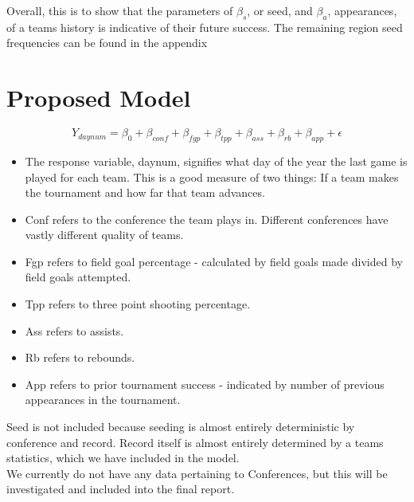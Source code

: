 \documentclass[]{scrartcl}
\begin{document}
Overall, this is to show that the parameters of $\beta_s$, or seed, and $\beta_a$, appearances, of a teams history is indicative of their future success. The remaining region seed frequencies can be found in the appendix
\section*{Proposed Model}
	\[
	Y_{daynum} = \beta_0 + \beta_{conf} + \beta_{fgp} +\beta_{tpp} + \beta_{ass} + \beta_{rb} + \beta_{app} + \epsilon
	\]
	\begin{itemize}
	\item The response variable, daynum, signifies what day of the year the last game is played for each team. This is a good measure of two things: If a team makes the tournament and how far that team advances.
		\item Conf refers to the conference the team plays in. Different conferences have vastly different quality of teams.
	\item 	Fgp refers to field goal percentage - calculated by field goals made divided by field goals attempted.
	\item 	Tpp refers to three point shooting percentage.
	\item 	Ass refers to assists. 
	\item 	Rb refers to rebounds.
	\item 	App refers to prior tournament success - indicated by number of previous appearances in the tournament.
\end{itemize}
Seed is not included because seeding is almost entirely deterministic by conference and record. Record itself is almost entirely determined by a teams statistics, which we have included in the model.\\
We currently do not have any data pertaining to Conferences, but this will be investigated and included into the final report.
\end{document}
